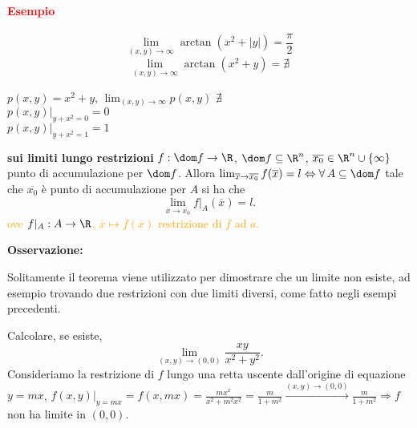 \begin{exbar}
	\paragraph{\textcolor{red}{Esempio}}
	\begin{equation*}
		\lim_{(x,y)\rightarrow\infty} \arctan(x^2+|y|)=\frac{\pi}{2}
	\end{equation*}
	\begin{equation*}
		\lim_{(x,y)\rightarrow\infty} \arctan(x^2+y)= \nexists
	\end{equation*}
	\segnaposto %
	\segnaposto %
\end{exbar}


\begin{exbar}
	$p(x,y)=x^2+y$, $\lim_{(x,y)\rightarrow\infty}p(x,y) \,\,\nexists$\\
	$p(x,y)|_{y+x^2=0}=0$\\
	$p(x,y)|_{y+x^2=1}=1$\\
	\segnaposto %
\end{exbar}


\begin{theorem} \textbf{sui limiti lungo restrizioni}
	$f:\dom f\rightarrow\R$, $\dom f \subseteq\R^n$, $\overline{x_0}\in \R^n\cup\{\infty\}$ punto di accumulazione per $\dom f$. Allora $\lim_{\overline{x}\rightarrow\overline{x_0}}f(\overline{x})=l\Leftrightarrow \forall\,A \subseteq \dom f$ tale che $\overline{x_0}$ è punto di accumulazione per $A$ si ha che 
	\begin{equation*}
		\lim_{\overline{x}\rightarrow\overline{x_0}}f|_A(\overline{x})=l.
	\end{equation*}
	\textcolor{orange}{ove $f|_A:A\rightarrow \R$, $\overline{x}\mapsto f(\overline{x})$ restrizione di $f$ ad $a$.}
\end{theorem}


\begin{attbar}
	\textbf{Osservazione:}
	
	Solitamente il teorema viene utilizzato per dimostrare che un limite non esiste, ad esempio trovando due restrizioni con due limiti diversi, come fatto negli esempi precedenti.
\end{attbar}


\begin{exbar}
\begin{example}
	Calcolare, se esiste,
	\begin{equation*}
		\lim_{(x,y)\rightarrow(0,0)}\frac{xy}{x^2+y^2}.
	\end{equation*}
	Consideriamo la restrizione di $f$ lungo una retta uscente dall'origine di equazione $y= mx$, $f(x,y)|_{y=mx}=f(x,mx)=\frac{mx^x}{x^2+m^2x^2}=\frac{m}{1+m^2}\xrightarrow{(x,y)\rightarrow(0,0)}\frac{m}{1+m^2} \Rightarrow f$ non ha limite in $(0,0)$.
\end{example}
\end{exbar}


